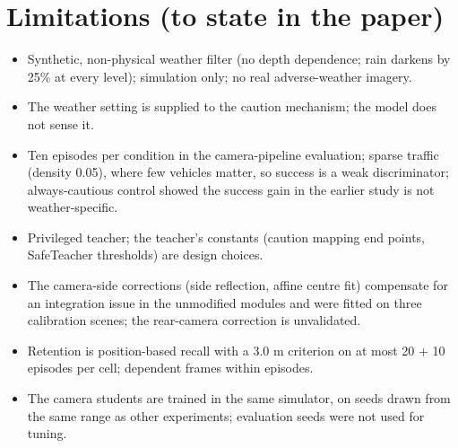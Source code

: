 \documentclass[11pt,a4paper]{article}
\begin{document}
\section{Limitations (to state in the paper)}
\begin{itemize}[leftmargin=*]
\item Synthetic, non-physical weather filter (no depth dependence; rain darkens by 25\% at every level); simulation only; no real adverse-weather imagery.
\item The weather setting is supplied to the caution mechanism; the model does not sense it.
\item Ten episodes per condition in the camera-pipeline evaluation; sparse traffic (density 0.05), where few vehicles matter, so success is a weak discriminator; always-cautious control showed the success gain in the earlier study is not weather-specific.
\item Privileged teacher; the teacher's constants (caution mapping end points, SafeTeacher thresholds) are design choices.
\item The camera-side corrections (side reflection, affine centre fit) compensate for an integration issue in the unmodified modules and were fitted on three calibration scenes; the rear-camera correction is unvalidated.
\item Retention is position-based recall with a 3.0 m criterion on at most 20 + 10 episodes per cell; dependent frames within episodes.
\item The camera students are trained in the same simulator, on seeds drawn from the same range as other experiments; evaluation seeds were not used for tuning.
\end{itemize}
\end{document}
